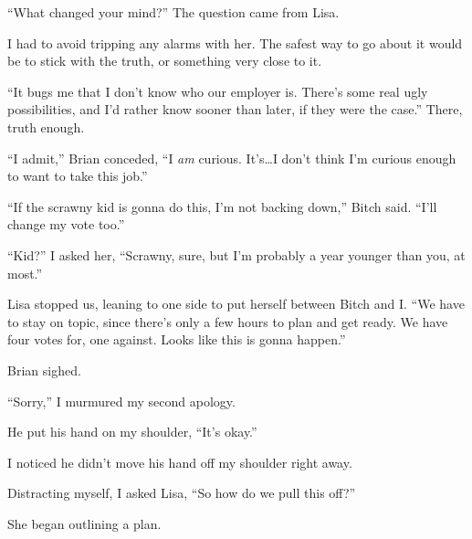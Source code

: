 ``What changed your mind?'' The question came from Lisa.



I had to avoid tripping any alarms with her.  The safest way to go about it would be to stick with the truth, or something very close to it.



``It bugs me that I don't know who our employer is.  There's some real ugly possibilities, and I'd rather know sooner than later, if they were the case.''  There, truth enough.



``I admit,'' Brian conceded, ``I \emph{am} curious.  It's\ldots I don't think I'm curious enough to want to take this job.''



``If the scrawny kid is gonna do this, I'm not backing down,'' Bitch said.  ``I'll change my vote too.''



``Kid?'' I asked her, ``Scrawny, sure, but I'm probably a year younger than you, at most.''



Lisa stopped us, leaning to one side to put herself between Bitch and I.  ``We have to stay on topic, since there's only a few hours to plan and get ready.  We have four votes for, one against.  Looks like this is gonna happen.''



Brian sighed.



``Sorry,'' I murmured my second apology.



He put his hand on my shoulder, ``It's okay.''



I noticed he didn't move his hand off my shoulder right away.



Distracting myself, I asked Lisa, ``So how do we pull this off?''



She began outlining a plan.





